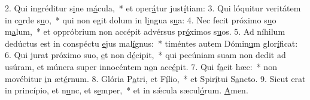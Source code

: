 2. Qui ingréditur s\uline{i}ne m\uline{á}cula,~* et oper\uline{á}tur just\uline{í}tiam:
3. Qui lóquitur veritátem in c\uline{o}rde s\uline{u}o,~* qui non egit dolum in l\uline{i}ngua s\uline{u}a:
4. Nec fecit próximo s\uline{u}o m\uline{a}lum,~* et oppróbrium non accépit advérsus pr\uline{ó}ximos s\uline{u}os.
5. Ad níhilum dedúctus est in conspéctu \uline{e}jus mal\uline{í}gnus:~* timéntes autem Dómin\uline{u}m glor\uline{í}ficat:
6. Qui jurat próximo suo, \uline{e}t non d\uline{é}cipit,~* qui pecúniam suam non dedit ad usúram, et múnera super innocéntem n\uline{o}n acc\uline{é}pit.
7. Qui f\uline{a}cit hæc:~* non movébitur \uline{i}n æt\uline{é}rnum.
8. Glória P\uline{a}tri, et F\uline{í}lio,~* et Spir\uline{í}tui S\uline{a}ncto.
9. Sicut erat in princípio, et n\uline{u}nc, et s\uline{e}mper,~* et in sǽcula sæcul\uline{ó}rum. \uline{A}men.
